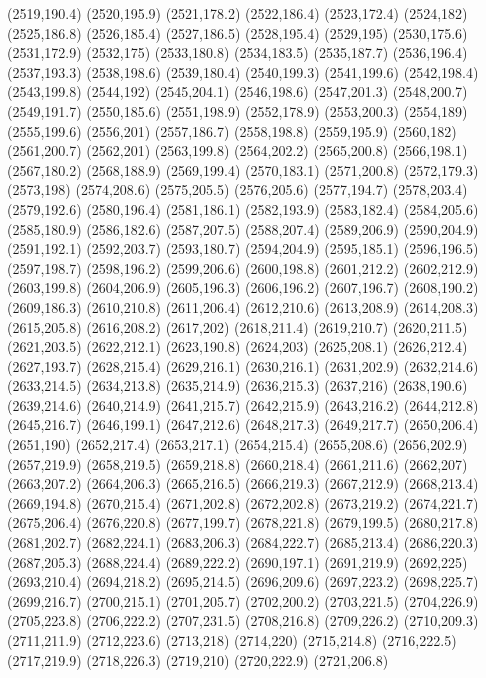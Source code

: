 (2519,190.4)
(2520,195.9)
(2521,178.2)
(2522,186.4)
(2523,172.4)
(2524,182)
(2525,186.8)
(2526,185.4)
(2527,186.5)
(2528,195.4)
(2529,195)
(2530,175.6)
(2531,172.9)
(2532,175)
(2533,180.8)
(2534,183.5)
(2535,187.7)
(2536,196.4)
(2537,193.3)
(2538,198.6)
(2539,180.4)
(2540,199.3)
(2541,199.6)
(2542,198.4)
(2543,199.8)
(2544,192)
(2545,204.1)
(2546,198.6)
(2547,201.3)
(2548,200.7)
(2549,191.7)
(2550,185.6)
(2551,198.9)
(2552,178.9)
(2553,200.3)
(2554,189)
(2555,199.6)
(2556,201)
(2557,186.7)
(2558,198.8)
(2559,195.9)
(2560,182)
(2561,200.7)
(2562,201)
(2563,199.8)
(2564,202.2)
(2565,200.8)
(2566,198.1)
(2567,180.2)
(2568,188.9)
(2569,199.4)
(2570,183.1)
(2571,200.8)
(2572,179.3)
(2573,198)
(2574,208.6)
(2575,205.5)
(2576,205.6)
(2577,194.7)
(2578,203.4)
(2579,192.6)
(2580,196.4)
(2581,186.1)
(2582,193.9)
(2583,182.4)
(2584,205.6)
(2585,180.9)
(2586,182.6)
(2587,207.5)
(2588,207.4)
(2589,206.9)
(2590,204.9)
(2591,192.1)
(2592,203.7)
(2593,180.7)
(2594,204.9)
(2595,185.1)
(2596,196.5)
(2597,198.7)
(2598,196.2)
(2599,206.6)
(2600,198.8)
(2601,212.2)
(2602,212.9)
(2603,199.8)
(2604,206.9)
(2605,196.3)
(2606,196.2)
(2607,196.7)
(2608,190.2)
(2609,186.3)
(2610,210.8)
(2611,206.4)
(2612,210.6)
(2613,208.9)
(2614,208.3)
(2615,205.8)
(2616,208.2)
(2617,202)
(2618,211.4)
(2619,210.7)
(2620,211.5)
(2621,203.5)
(2622,212.1)
(2623,190.8)
(2624,203)
(2625,208.1)
(2626,212.4)
(2627,193.7)
(2628,215.4)
(2629,216.1)
(2630,216.1)
(2631,202.9)
(2632,214.6)
(2633,214.5)
(2634,213.8)
(2635,214.9)
(2636,215.3)
(2637,216)
(2638,190.6)
(2639,214.6)
(2640,214.9)
(2641,215.7)
(2642,215.9)
(2643,216.2)
(2644,212.8)
(2645,216.7)
(2646,199.1)
(2647,212.6)
(2648,217.3)
(2649,217.7)
(2650,206.4)
(2651,190)
(2652,217.4)
(2653,217.1)
(2654,215.4)
(2655,208.6)
(2656,202.9)
(2657,219.9)
(2658,219.5)
(2659,218.8)
(2660,218.4)
(2661,211.6)
(2662,207)
(2663,207.2)
(2664,206.3)
(2665,216.5)
(2666,219.3)
(2667,212.9)
(2668,213.4)
(2669,194.8)
(2670,215.4)
(2671,202.8)
(2672,202.8)
(2673,219.2)
(2674,221.7)
(2675,206.4)
(2676,220.8)
(2677,199.7)
(2678,221.8)
(2679,199.5)
(2680,217.8)
(2681,202.7)
(2682,224.1)
(2683,206.3)
(2684,222.7)
(2685,213.4)
(2686,220.3)
(2687,205.3)
(2688,224.4)
(2689,222.2)
(2690,197.1)
(2691,219.9)
(2692,225)
(2693,210.4)
(2694,218.2)
(2695,214.5)
(2696,209.6)
(2697,223.2)
(2698,225.7)
(2699,216.7)
(2700,215.1)
(2701,205.7)
(2702,200.2)
(2703,221.5)
(2704,226.9)
(2705,223.8)
(2706,222.2)
(2707,231.5)
(2708,216.8)
(2709,226.2)
(2710,209.3)
(2711,211.9)
(2712,223.6)
(2713,218)
(2714,220)
(2715,214.8)
(2716,222.5)
(2717,219.9)
(2718,226.3)
(2719,210)
(2720,222.9)
(2721,206.8)
